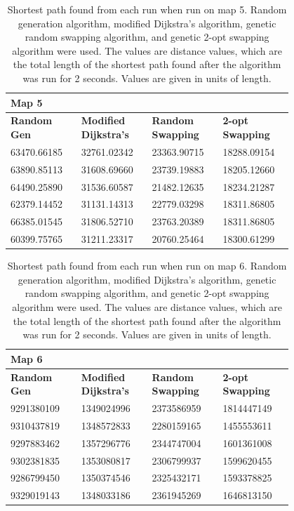 \documentclass{article}
\begin{document}
\begin{appendices}
\begin{table}[H]
    \caption{Shortest path found from each run when run on map 5. Random generation algorithm, modified Dijkstra's algorithm, genetic random swapping algorithm, and genetic 2-opt swapping algorithm were used. The values are distance values, which are the total length of the shortest path found after the algorithm was run for 2 seconds. Values are given in units of length.}
    \centering
    \begin{tabular}{|p{0.2\linewidth}|p{0.2\linewidth}|p{0.2\linewidth}|p{0.2\linewidth}|}
    \hline
        \textbf{Map 5} & ~ & ~ & ~ \\ \hline
        \textbf{Random Gen} & \textbf{Modified Dijkstra's} & \textbf{Random Swapping} & \textbf{2-opt Swapping} \\ \hline
        63470.66185 & 32761.02342 & 23363.90715 & 18288.09154 \\ \hline
        63890.85113 & 31608.69660 & 23739.19883 & 18205.12660 \\ \hline
        64490.25890 & 31536.60587 & 21482.12635 & 18234.21287 \\ \hline
        62379.14452 & 31131.14313 & 22779.03298 & 18311.86805 \\ \hline
        66385.01545 & 31806.52710 & 23763.20389 & 18311.86805 \\ \hline
        60399.75765 & 31211.23317 & 20760.25464 & 18300.61299 \\ \hline
     \end{tabular}
\end{table}

\begin{table}[H]
    \caption{Shortest path found from each run when run on map 6. Random generation algorithm, modified Dijkstra's algorithm, genetic random swapping algorithm, and genetic 2-opt swapping algorithm were used. The values are distance values, which are the total length of the shortest path found after the algorithm was run for 2 seconds. Values are given in units of length.}
    \centering
    \begin{tabular}{|p{0.2\linewidth}|p{0.2\linewidth}|p{0.2\linewidth}|p{0.2\linewidth}|}
    \hline
        \textbf{Map 6} & ~ & ~ & ~ \\ \hline
        \textbf{Random Gen} & \textbf{Modified Dijkstra's} & \textbf{Random Swapping} & \textbf{2-opt Swapping} \\ \hline
        9291380109 & 1349024996 & 2373586959 & 1814447149 \\ \hline
        9310437819 & 1348572833 & 2280159165 & 1455553611 \\ \hline
        9297883462 & 1357296776 & 2344747004 & 1601361008 \\ \hline
        9302381835 & 1353080817 & 2306799937 & 1599620455 \\ \hline
        9286799450 & 1350374546 & 2325432171 & 1593378825 \\ \hline
        9329019143 & 1348033186 & 2361945269 & 1646813150 \\ \hline
    \end{tabular}
\end{table}


\end{appendices}
\end{document}
